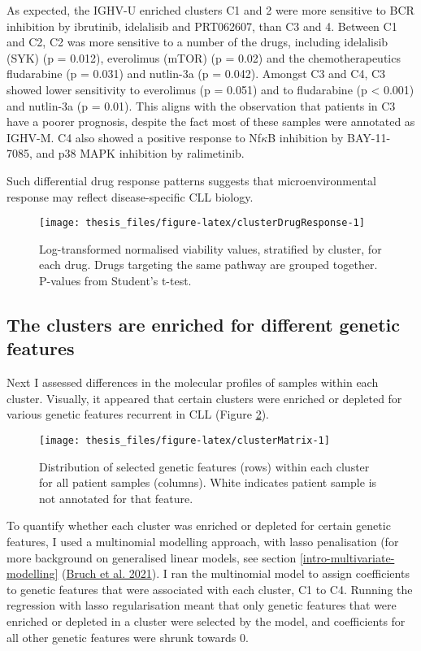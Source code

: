 \documentclass[11pt, a4paper, twosided]{book}
\begin{document}
As expected, the IGHV-U enriched clusters C1 and 2 were more sensitive to BCR inhibition by ibrutinib, idelalisib and PRT062607, than C3 and 4. Between C1 and C2, C2 was more sensitive to a number of the drugs, including idelalisib (SYK) (p = 0.012), everolimus (mTOR) (p = 0.02) and the chemotherapeutics fludarabine (p = 0.031) and nutlin-3a (p = 0.042). Amongst C3 and C4, C3 showed lower sensitivity to everolimus (p = 0.051) and to fludarabine (p \textless{} 0.001) and nutlin-3a (p = 0.01). This aligns with the observation that patients in C3 have a poorer prognosis, despite the fact most of these samples were annotated as IGHV-M. C4 also showed a positive response to Nf\(\kappa\)B inhibition by BAY-11-7085, and p38 MAPK inhibition by ralimetinib.

Such differential drug response patterns suggests that microenvironmental response may reflect disease-specific CLL biology.


\begin{figure}

{\centering \texttt{[image: thesis\_files/figure-latex/clusterDrugResponse-1]} 

}

\caption{Log-transformed normalised viability values, stratified by cluster, for each drug. Drugs targeting the same pathway are grouped together. P-values from Student's t-test.}\label{fig:clusterDrugResponse}
\end{figure}
\hypertarget{cluster-genetics}{%
\subsection{The clusters are enriched for different genetic features}\label{cluster-genetics}}

Next I assessed differences in the molecular profiles of samples within each cluster. Visually, it appeared that certain clusters were enriched or depleted for various genetic features recurrent in CLL (Figure \ref{fig:clusterMatrix}).


\begin{figure}

{\centering \texttt{[image: thesis\_files/figure-latex/clusterMatrix-1]} 

}

\caption{Distribution of selected genetic features (rows) within each cluster for all patient samples (columns). White indicates patient sample is not annotated for that feature.}\label{fig:clusterMatrix}
\end{figure}
To quantify whether each cluster was enriched or depleted for certain genetic features, I used a multinomial modelling approach, with lasso penalisation (for more background on generalised linear models, see section \ref{intro-multivariate-modelling} (\protect\hyperlink{ref-Giles2021}{Bruch et al. 2021}).
I ran the multinomial model to assign coefficients to genetic features that were associated with each cluster, C1 to C4. Running the regression with lasso regularisation meant that only genetic features that were enriched or depleted in a cluster were selected by the model, and coefficients for all other genetic features were shrunk towards 0.
\end{document}
